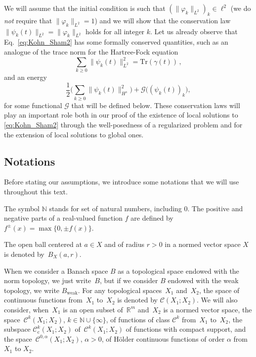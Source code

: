 \documentclass[12pt,a4paper]{amsart}
\numberwithin{equation}{section}
\begin{document}
	We will assume that the initial condition is such that $(\|\varphi_k\|_{L^2})_k \in \ell^2 $ (we do \emph{not} require that $\|\varphi_k\|_{L^2}=1$) and we will show that the conservation law $ \| \psi_k(t) \|_{L^2} = \| \varphi_k \|_{L^2} $ holds for all integer $k$. Let us already observe that Eq.~\eqref{eq:Kohn_Sham2} has some formally conserved quantities, such as an analogue of the trace norm for the Hartree-Fock equation
	\begin{equation}
		\sum_{k \geq 0} \| \psi_k(t) \|^2_{L^2} 
		= \mathrm{Tr}(\gamma(t))\,,%
	\end{equation}
	and an energy  
	\begin{equation}
		\frac{1}{2} \Big(\sum_{k \geq 0} \| \psi_k(t) \|_{H^s}^2\Big) + \mathscr{G}\big((\psi_k(t))_k\big),
	\end{equation}
	for some functional $\mathscr{G}$ that will be defined below. These conservation laws will play an important role both in our proof of the existence of local solutions to \eqref{eq:Kohn_Sham2} through the well-posedness of a regularized problem and for the extension of local solutions to global ones. 
	
	
	\subsection{Notations}
	
	Before stating our assumptions, we introduce some notations that we will use throughout this text. 
	
	The symbol $\mathbb{N}$ stands for set of natural numbers, including $0$. The positive and negative parts of a real-valued function $f$ are defined by $f^{\pm}(x)=\max\{0,\pm f(x)\}$. 
	
	The open ball centered at $a\in X$ and of radius $r>0$ in a normed vector space $X$ is denoted by~$B_X(a,r)$. 
	
	When we consider a Banach space $B$ as a topological space endowed with the norm topology, we just write~$B$, but if we consider $B$ endowed with the weak topology, we write $B_{\mathrm{weak}}$. For any topological spaces~$X_1$ and~$X_2$, the space of continuous functions from~$X_1$ to~$X_2$ is denoted by $\mathscr{C}(X_1;X_2)$.  We will also consider, when~$X_1$ is an open subset of~$\mathbb{R}^m$ and~$X_2$ is a normed vector space, the space~$\mathscr{C}^k(X_1;X_2)$, $k\in\mathbb{N}\cup\{\infty\}$, of functions of class $\mathscr{C}^k$ from~$X_1$ to~$X_2$,  the subspace $\mathscr{C}^k_{\mathrm{c}}(X_1;X_2)$ of~$\mathscr{C}^k(X_1;X_2)$ of functions with compact support, and the space~$\mathscr{C}^{0,\alpha}(X_1;X_2)$, $\alpha>0$, of H\"older continuous functions of order $\alpha$ from $X_1$ to $X_2$. 
	
\end{document}
